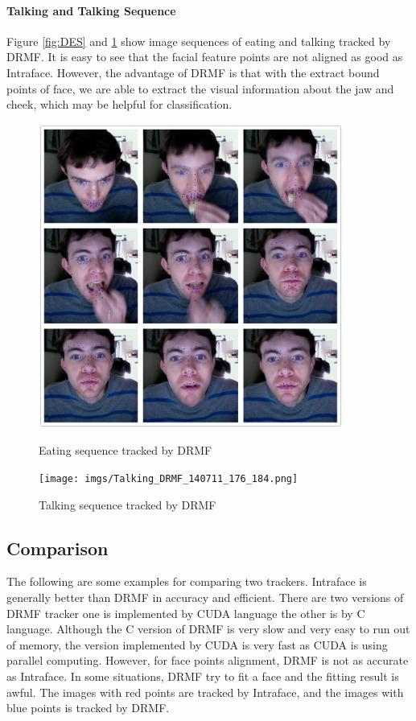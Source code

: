 \paragraph{Talking and Talking Sequence}
Figure \ref{fig:DES} and \ref{fig:DTS} show image sequences of eating and talking tracked by DRMF. It is easy to see that the facial feature points are not aligned as good as Intraface. However, the advantage of DRMF is that with the extract bound points of face, we are able to extract the visual information about the jaw and cheek, which may be helpful for classification.
\begin{figure}[p]
\centering
\includegraphics[width=100mm]{imgs/Tracking_DRMF_eating.png}
\caption{Eating sequence tracked by DRMF}
\label{fig:DES}
\texttt{[image: imgs/Talking\_DRMF\_140711\_176\_184.png]}
\caption{Talking sequence tracked by DRMF}
\label{fig:DTS}
\end{figure}
\newpage
\subsection{Comparison}
The following are some examples for comparing two trackers. Intraface is generally better than DRMF in accuracy and efficient. There are two versions of DRMF tracker one is implemented by CUDA language the other is by C language. Although the C version of DRMF is very slow and very easy to run out of memory, the version implemented by CUDA is very fast as CUDA is using parallel computing. However, for face points alignment, DRMF is not as accurate as Intraface. In some situations, DRMF try to fit a face and the fitting result is awful. The images with red points are tracked by Intraface, and the images with blue points is tracked by DRMF.

